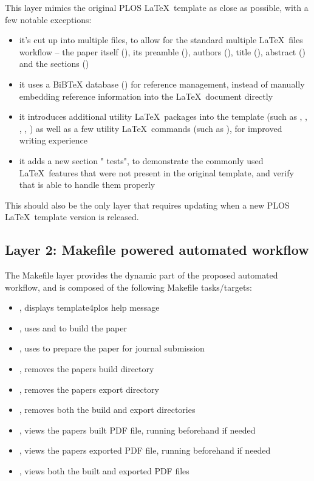 This layer mimics the original PLOS \LaTeX~template as close as possible, with a few notable exceptions:
\begin{itemize}
    \item it's cut up into multiple files, to allow for the standard multiple \LaTeX~files workflow -- the paper itself (), its preamble (), authors (), title (), abstract () and the sections ()
    \item it uses a BiBTeX database () for reference management, instead of manually embedding reference information into the \LaTeX~document directly
    \item it introduces additional utility \LaTeX~packages into the template (such as , , , , ) as well as a few utility \LaTeX~commands (such as ), for improved writing experience
    \item it adds a new section " tests", to demonstrate the commonly used \LaTeX~features that were not present in the original template, and verify that  is able to handle them properly
\end{itemize}

This should also be the only layer that requires updating when a new PLOS \LaTeX~template version is released.

\subsection*{Layer 2: Makefile powered automated workflow}

The Makefile layer provides the dynamic part of the proposed automated workflow, and is composed of the following Makefile tasks/targets:
\begin{itemize}
    \item {}, displays template4plos help message
    \item {}, uses  and  to build the paper
    \item {}, uses  to prepare the paper for journal submission
    \item {}, removes the papers build directory
    \item {}, removes the papers export directory
    \item {}, removes both the build and export directories
    \item {}, views the papers built PDF file, running  beforehand if needed
    \item {}, views the papers exported PDF file, running  beforehand if needed
    \item {}, views both the built and exported PDF files
\end{itemize}

